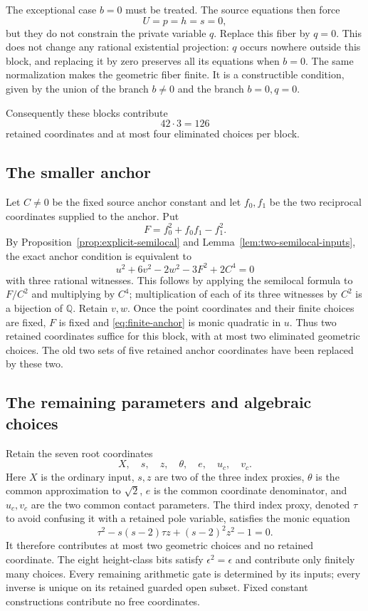 The exceptional case $b=0$ must be treated.  The source equations then
force
\[
 U=p=h=s=0,
\]
but they do not constrain the private variable $q$.  Replace this
fiber by $q=0$.  This does not change any rational existential projection:
$q$ occurs nowhere outside this block, and replacing it by zero
preserves all its equations when $b=0$.  The same normalization makes
the geometric fiber finite.  It is a constructible condition, given
by the union of the branch $b\ne0$ and the branch $b=0,q=0$.

Consequently these blocks contribute
\[
 42\cdot3=126
\]
retained coordinates and at most four eliminated choices per block.

\subsection{The smaller anchor}

Let $C\ne0$ be the fixed source anchor constant and let $f_0,f_1$
be the two reciprocal coordinates supplied to the anchor.  Put
\[
 F=f_0^2+f_0f_1-f_1^2.
\]
By Proposition~\ref{prop:explicit-semilocal} and
Lemma~\ref{lem:two-semilocal-inputs}, the exact anchor condition is
equivalent to
\begin{equation}\label{eq:finite-anchor}
 u^2+6v^2-2w^2-3F^2+2C^4=0
\end{equation}
with three rational witnesses.  This follows by applying the
semilocal formula to $F/C^2$ and multiplying by $C^4$; multiplication
of each of its three witnesses by $C^2$ is a bijection of $\mathbb Q$.
Retain $v,w$.  Once the point coordinates and their finite choices
are fixed, $F$ is fixed and \eqref{eq:finite-anchor} is monic quadratic
in $u$.  Thus two retained coordinates suffice for this block, with
at most two eliminated geometric choices.  The old two sets of five
retained anchor coordinates have been replaced by these two.

\subsection{The remaining parameters and algebraic choices}

Retain the seven root coordinates
\[
 X,\quad s,\quad z,\quad\theta,\quad e,\quad u_c,\quad v_c.
\]
Here $X$ is the ordinary input, $s,z$ are two of the three index
proxies, $\theta$ is the common approximation to $\sqrt2$, $e$ is
the common coordinate denominator, and $u_c,v_c$ are the two common
contact parameters.  The third index proxy, denoted $\tau$ to avoid
confusing it with a retained pole variable, satisfies the monic equation
\[
 \tau^2-s(s-2)\tau z+(s-2)^2z^2-1=0.
\]
It therefore contributes at most two geometric choices and no retained
coordinate.  The eight height-class bits satisfy $\epsilon^2=\epsilon$
and contribute only finitely many choices.  Every remaining arithmetic
gate is determined by its inputs; every inverse is unique on its
retained guarded open subset.  Fixed constant constructions contribute
no free coordinates.

